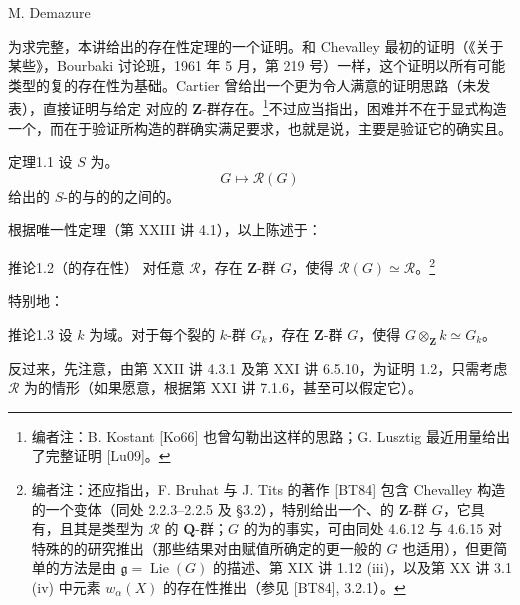 \begin{center}M. Demazure\end{center}
为求完整，本讲给出的存在性定理的一个证明。和 Chevalley 最初的证明（《关于某些》，Bourbaki 讨论班，1961 年 5 月，第 219 号）一样，这个证明以所有可能类型的复的存在性为基础。Cartier 曾给出一个更为令人满意的证明思路（未发表），直接证明与给定 对应的 $\mathbf Z$-群存在。\footnote{编者注：B. Kostant [Ko66] 也曾勾勒出这样的思路；G. Lusztig 最近用量给出了完整证明 [Lu09]。}不过应当指出，困难并不在于显式构造一个，而在于验证所构造的群确实满足要求，也就是说，主要是验证它的确实且。

\begin{SGAresult}{定理}{1.1}
设 $S$ 为。
\[G\longmapsto\mathcal R(G)\]
给出的 $S$-的与的的之间的。
\end{SGAresult}
根据唯一性定理（第 XXIII 讲 4.1），以上陈述于：
\begin{SGAresult}{推论}{1.2（的存在性）}
对任意 $\mathcal R$，存在 $\mathbf Z$-群 $G$，使得 $\mathcal R(G)\simeq\mathcal R$。\footnote{编者注：还应指出，F. Bruhat 与 J. Tits 的著作 [BT84] 包含 Chevalley 构造的一个变体（同处 2.2.3--2.2.5 及 \S 3.2），特别给出一个、的 $\mathbf Z$-群 $G$，它具有，且其是类型为 $\mathcal R$ 的 $\mathbf Q$-群；$G$ 的为的事实，可由同处 4.6.12 与 4.6.15 对特殊的的研究推出（那些结果对由赋值所确定的更一般的 $G$ 也适用），但更简单的方法是由 $\mathfrak g=\operatorname{Lie}(G)$ 的描述、第 XIX 讲 1.12 (iii)，以及第 XX 讲 3.1 (iv) 中元素 $w_\alpha(X)$ 的存在性推出（参见 [BT84], 3.2.1）。}
\end{SGAresult}
特别地：
\begin{SGAresult}{推论}{1.3}
设 $k$ 为域。对于每个裂的 $k$-群 $G_k$，存在 $\mathbf Z$-群 $G$，使得 $G\otimes_{\mathbf Z}k\simeq G_k$。
\end{SGAresult}
反过来，先注意，由第 XXII 讲 4.3.1 及第 XXI 讲 6.5.10，为证明 1.2，只需考虑 $\mathcal R$ 为的情形（如果愿意，根据第 XXI 讲 7.1.6，甚至可以假定它）。

